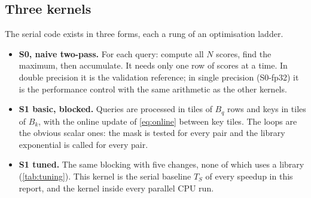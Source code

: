 \subsection{Three kernels}
The serial code exists in three forms, each a rung of an optimisation ladder.

\begin{itemize}
\item \textbf{S0, naive two-pass.} For each query: compute all $N$ scores, find the
maximum, then accumulate. It needs only one row of scores at a time. In double
precision it is the validation reference; in single precision (S0-fp32) it is the
performance control with the same arithmetic as the other kernels.
\item \textbf{S1 basic, blocked.} Queries are processed in tiles of $B_q$ rows and
keys in tiles of $B_k$, with the online update of \cref{eq:online} between key
tiles. The loops are the obvious scalar ones: the mask is tested for every pair
and the library exponential is called for every pair.
\item \textbf{S1 tuned.} The same blocking with five changes, none of which uses a
library (\cref{tab:tuning}). This kernel is the serial baseline $T_S$ of every
speedup in this report, and the kernel inside every parallel CPU run.
\end{itemize}


